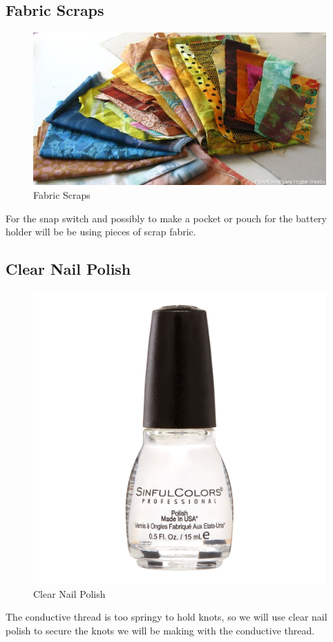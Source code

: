 \documentclass[letterpaper,twoside,12pt]{article}
\begin{document}
\subsection{Fabric Scraps}
\begin{figure}[hbpt]\begin{centering}%
\includegraphics[width=5in]{FabricScraps.jpg}
\caption{Fabric Scraps}
\label{fig:fabricscraps}
\end{centering}\end{figure}
For the snap switch and possibly to make a pocket or pouch for the battery 
holder will be be using pieces of scrap fabric.
\clearpage
\subsection{Clear Nail Polish}
\begin{figure}[hbpt]\begin{centering}%
\includegraphics[width=5in]{ClearNailPolish.jpeg}
\caption{Clear Nail Polish}
\label{fig:clearnailpolish}
\end{centering}\end{figure}
The conductive thread is too springy to hold knots, so we will use clear nail 
polish to secure the knots we will be making with the conductive thread.
\clearpage
\end{document}
